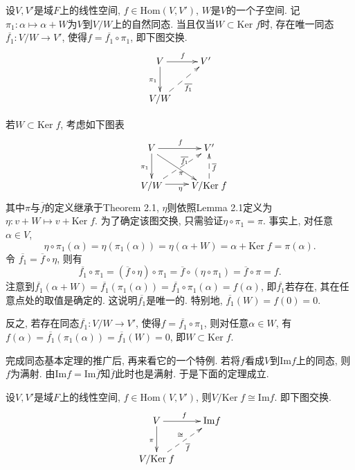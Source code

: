 \documentclass[color=green,mathpazo,titlestyle=hang]{elegantbook}
\begin{document}
\hypertarget{Proposition 2.4}{}
\begin{newprop}
	设$V,V'$是域$F$上的线性空间, $f\in\mathrm{Hom}(V,V')$, $W$是$V$的一个子空间. 记$\pi_1:\alpha\longmapsto \alpha+W$为$V$到$V/W$上的自然同态. 当且仅当$W\subset\mathrm{Ker}\;f$时,  存在唯一同态$\overline{f_1}:V/W\longrightarrow V'$,  使得$f=\overline{f_1}\circ\pi_1$, 即下图交换. 
	\[\xymatrix{
		V\ar[d]_{\pi_1}\ar[r]^{f} & V' \\
		V/W \ar@{-->}[ur]_{\overline{f_1}} &  
	}\]
\end{newprop} 


\begin{newproof}
	若$W\subset\mathrm{Ker}\;f$, 考虑如下图表
	\[\xymatrix{
		V\ar[d]_{\pi_1}\ar[r]^{f}\ar@<-2pt>[rd]_{\quad\quad\quad\pi} & V' \\
		V/W \ar@{-->}[ur]^{\quad\quad\quad\quad\quad\overline{f_1}}\ar@<2pt>[r]_{\eta} & V/\mathrm{Ker}\;f \ar@{-->}[u]_{\overline{f}}
	}\]
    其中$\pi$与$\overline{f}$的定义继承于Theorem 2.1, $\eta$则依照Lemma 2.1定义为$\eta:v+W\mapsto v+\mathrm{Ker}\;f$. 为了确定该图交换, 只需验证$\eta\circ\pi_1=\pi$. 事实上, 对任意$\alpha\in V$, 
    \[
    \eta\circ\pi_1(\alpha)=\eta(\pi_1(\alpha))=\eta(\alpha+W)=\alpha+\mathrm{Ker}\;f=\pi(\alpha).
    \] 
    令 $\overline{f_1}=\overline{f}\circ\eta$, 则有
    \[
    \overline{f_1}\circ\pi_1=(\overline{f}\circ\eta)\circ\pi_1=
    \overline{f}\circ(\eta\circ\pi_1)=\overline{f}\circ\pi=f.
    \]
    注意到$\overline{f_1}(\alpha+W)=\overline{f_1}(\pi_1(\alpha))=\overline{f_1}\circ\pi_1(\alpha)=f(\alpha)$, 即$\overline{f_1}$若存在, 其在任意点处的取值是确定的. 这说明$\overline{f_1}$是唯一的. 特别地, $\overline{f_1}(W)=f(0)=0$.\par
    反之, 若存在同态$\overline{f_1}:V/W\longrightarrow V'$, 使得$f=\overline{f_1}\circ\pi_1$, 则对任意$\alpha\in W$, 有 $f(\alpha)=\overline{f_1}(\pi_1(\alpha))=\overline{f_1}(W)=0$, 即$W\subset\mathrm{Ker}\;f$. 
    
\end{newproof}	
\par
完成同态基本定理的推广后, 再来看它的一个特例. 若将$f$看成$V$到$\mathrm{Im}f$上的同态, 则$f$为满射. 由$\mathrm{Im}f=\mathrm{Im}\overline{f}$知$\overline{f}$此时也是满射. 于是下面的定理成立.


\begin{newthem}

	设$V,V'$是域$F$上的线性空间, $f\in\mathrm{Hom}(V,V')$,  则$V/\mathrm{Ker}\;f\cong\mathrm{Im}f$. 即下图交换.
	\[\xymatrix{
		V\ar[d]_{\pi}\ar[r]^{f} & \mathrm{Im}f \\
		V/\mathrm{Ker}\;f \ar@{-->}[ur]_{\overline{f}}^{\cong} &  
	}\]

\end{newthem}
\end{document}
